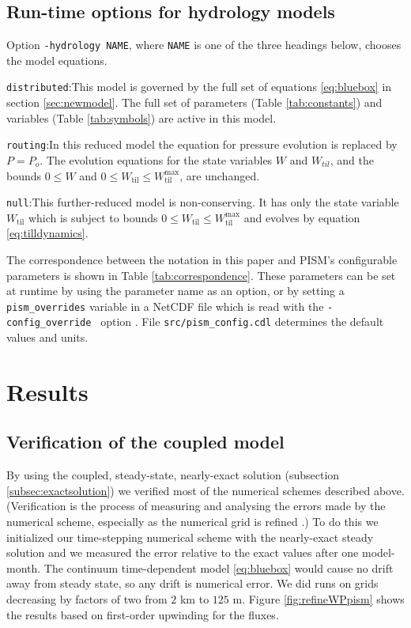 \documentclass[gmd]{copernicus}   %
\begin{document}
\subsection{Run-time options for hydrology models} \label{subsec:pismdoc}  Option \texttt{-hydrology NAME}, where \texttt{NAME} is one of the three headings below, chooses the model equations.

\medskip
\noindent \texttt{distributed}:\quad  This model is governed by the full set of equations \eqref{eq:bluebox} in section \ref{sec:newmodel}.  The full set of parameters (Table \ref{tab:constants}) and variables (Table \ref{tab:symbols}) are active in this model.

\medskip
\noindent \texttt{routing}:\quad  In this reduced model the equation for pressure evolution is replaced by $P = P_o$.  The evolution equations for the state variables $W$ and $W_{til}$, and the bounds $0\le W$ and $0\le W_{\text{til}} \le W_{\text{til}}^{\text{max}}$, are unchanged.

\medskip
\noindent \texttt{null}:\quad  This further-reduced model is non-conserving.  It has only the state variable $W_{\text{til}}$ which is subject to bounds $0\le W_{\text{til}} \le W_{\text{til}}^{\text{max}}$ and evolves by equation \eqref{eq:tilldynamics}.

\medskip
The correspondence between the notation in this paper and PISM's configurable parameters is shown in Table \ref{tab:correspondence}.  These parameters can be set at runtime by using the parameter name as an option, or by setting a \verb|pism_overrides| variable in a NetCDF file which is read with the \verb|-config_override | option \citep{pism-user-manual}.  File \verb|src/pism_config.cdl| determines the default values and units.


\section{Results}  \label{sec:results}

\subsection{Verification of the coupled model}  By using the coupled, steady-state, nearly-exact solution (subsection \ref{subsec:exactsolution}) we verified most of the numerical schemes described above.  (Verification is the process of measuring and analysing the errors made by the numerical scheme, especially as the numerical grid is refined \citep{Wesseling}.)  To do this we initialized our time-stepping numerical scheme with the nearly-exact steady solution and we measured the error relative to the exact values after one model-month.  The continuum time-dependent model \eqref{eq:bluebox} would cause no drift away from steady state, so any drift is numerical error.  We did runs on grids decreasing by factors of two from $2$ km to $125$ m.  Figure \ref{fig:refineWPpism} shows the results based on first-order upwinding for the fluxes.
\end{document}
